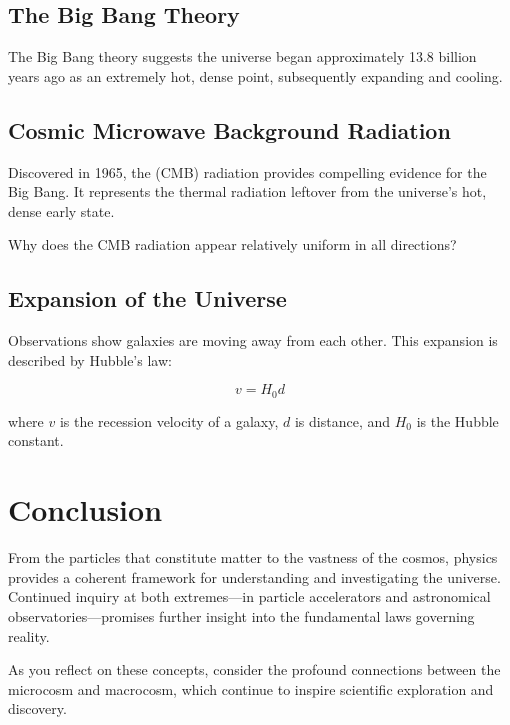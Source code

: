 \subsection{The Big Bang Theory}
\FloatBarrier

The Big Bang theory suggests the universe began approximately 13.8 billion years ago as an extremely hot, dense point, subsequently expanding and cooling.

\subsection{Cosmic Microwave Background Radiation}
\FloatBarrier

Discovered in 1965, the  (CMB) radiation provides compelling evidence for the Big Bang. It represents the thermal radiation leftover from the universe's hot, dense early state.

\begin{stopandthink}
Why does the CMB radiation appear relatively uniform in all directions?
\end{stopandthink}

\subsection{Expansion of the Universe}
\FloatBarrier

Observations show galaxies are moving away from each other. This expansion is described by Hubble's law:

\[
v = H_0 d
\]

where $v$ is the recession velocity of a galaxy, $d$ is distance, and $H_0$ is the Hubble constant.


\FloatBarrier

\section*{Conclusion}

From the particles that constitute matter to the vastness of the cosmos, physics provides a coherent framework for understanding and investigating the universe. Continued inquiry at both extremes—in particle accelerators and astronomical observatories—promises further insight into the fundamental laws governing reality.

As you reflect on these concepts, consider the profound connections between the microcosm and macrocosm, which continue to inspire scientific exploration and discovery.